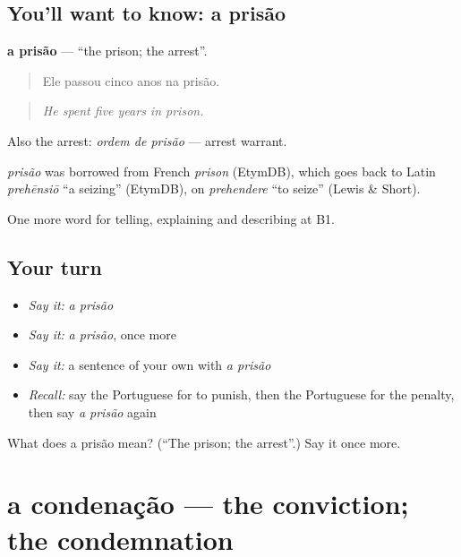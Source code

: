 \subsection*{You'll want to know: a prisão}
\textbf{a prisão} — \textquotedblleft{}the prison; the arrest\textquotedblright{}.

\begin{quote}
Ele passou cinco anos na prisão.
\end{quote}

\begin{quote}
\emph{He spent five years in prison.}
\end{quote}

Also the arrest: \emph{ordem de prisão} — arrest warrant.

\begin{cousinweb}
\emph{prisão} was borrowed from French \emph{prison} (EtymDB), which goes back to Latin \emph{prehēnsiō} \textquotedblleft{}a seizing\textquotedblright{} (EtymDB), on \emph{prehendere} \textquotedblleft{}to seize\textquotedblright{} (Lewis \& Short).
\end{cousinweb}

\begin{grammarlens}[title={What you've built}]
One more word for telling, explaining and describing at B1.
\end{grammarlens}

\subsection*{Your turn}
\begin{itemize}
\raggedright
  \item \emph{Say it:} \emph{a prisão}
  \item \emph{Say it:} \emph{a prisão}, once more
  \item \emph{Say it:} a sentence of your own with \emph{a prisão}
  \item \emph{Recall:} say the Portuguese for to punish, then the Portuguese for the penalty, then say \emph{a prisão} again
\end{itemize}

\begin{tcolorbox}[breakable,colback=teal!4,colframe=teal!35!black,title={Before you move on}]
What does a prisão mean? (\textquotedblleft{}The prison; the arrest\textquotedblright{}.) Say it once more.
\end{tcolorbox}
\section[a condenação]{a condenação — the conviction; the condemnation}

